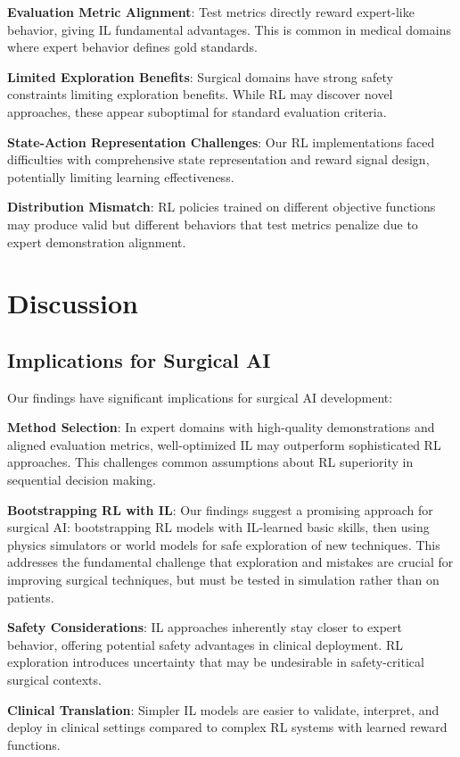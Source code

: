 \documentclass[runningheads]{llncs}
\begin{document}
\textbf{Evaluation Metric Alignment}: Test metrics directly reward expert-like behavior, giving IL fundamental advantages. This is common in medical domains where expert behavior defines gold standards.

\textbf{Limited Exploration Benefits}: Surgical domains have strong safety constraints limiting exploration benefits. While RL may discover novel approaches, these appear suboptimal for standard evaluation criteria.

\textbf{State-Action Representation Challenges}: Our RL implementations faced difficulties with comprehensive state representation and reward signal design, potentially limiting learning effectiveness.

\textbf{Distribution Mismatch}: RL policies trained on different objective functions may produce valid but different behaviors that test metrics penalize due to expert demonstration alignment.

\section{Discussion}

\subsection{Implications for Surgical AI}

Our findings have significant implications for surgical AI development:

\textbf{Method Selection}: In expert domains with high-quality demonstrations and aligned evaluation metrics, well-optimized IL may outperform sophisticated RL approaches. This challenges common assumptions about RL superiority in sequential decision making.

\textbf{Bootstrapping RL with IL}: Our findings suggest a promising approach for surgical AI: bootstrapping RL models with IL-learned basic skills, then using physics simulators or world models for safe exploration of new techniques. This addresses the fundamental challenge that exploration and mistakes are crucial for improving surgical techniques, but must be tested in simulation rather than on patients.

\textbf{Safety Considerations}: IL approaches inherently stay closer to expert behavior, offering potential safety advantages in clinical deployment. RL exploration introduces uncertainty that may be undesirable in safety-critical surgical contexts.

\textbf{Clinical Translation}: Simpler IL models are easier to validate, interpret, and deploy in clinical settings compared to complex RL systems with learned reward functions.
\end{document}
